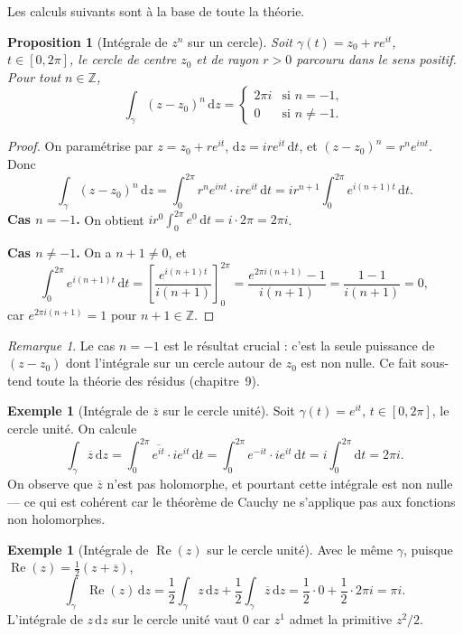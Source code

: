 \documentclass[12pt,a4paper,openany]{book}
\theoremstyle{definition}
\newtheorem{exemple}[definition]{Exemple}
\theoremstyle{plain}
\newtheorem{proposition}[definition]{Proposition}
\theoremstyle{remark}
\newtheorem{remarque}[definition]{Remarque}
\newcommand{\Z}{\mathbb{Z}}
\DeclareMathOperator{\re}{Re}
\newcommand{\dd}{\mathrm{d}}
\newcommand{\conj}[1]{\overline{#1}}
\begin{document}
Les calculs suivants sont à la base de toute la théorie.

\begin{proposition}[Intégrale de $z^n$ sur un cercle]\label{prop:integrale-zn-cercle}
Soit $\gamma(t) = z_0 + re^{it}$, $t \in [0, 2\pi]$, le cercle de centre
$z_0$ et de rayon $r > 0$ parcouru dans le sens positif. Pour tout
$n \in \Z$,
\[
  \int_\gamma (z - z_0)^n \, \dd z =
  \begin{cases}
    2\pi i & \text{si } n = -1, \\
    0      & \text{si } n \neq -1.
  \end{cases}
\]
\end{proposition}

\begin{proof}
On paramétrise par $z = z_0 + re^{it}$, $\dd z = ire^{it}\,\dd t$, et
$(z - z_0)^n = r^n e^{int}$. Donc
\[
  \int_\gamma (z-z_0)^n\,\dd z
  = \int_0^{2\pi} r^n e^{int} \cdot ire^{it}\,\dd t
  = ir^{n+1} \int_0^{2\pi} e^{i(n+1)t}\,\dd t.
\]
\textbf{Cas $n = -1$.} On obtient $ir^0 \int_0^{2\pi} e^{0}\,\dd t
= i \cdot 2\pi = 2\pi i$.

\textbf{Cas $n \neq -1$.} On a $n+1 \neq 0$, et
\[
  \int_0^{2\pi} e^{i(n+1)t}\,\dd t
  = \left[\frac{e^{i(n+1)t}}{i(n+1)}\right]_0^{2\pi}
  = \frac{e^{2\pi i(n+1)} - 1}{i(n+1)} = \frac{1-1}{i(n+1)} = 0,
\]
car $e^{2\pi i(n+1)} = 1$ pour $n+1 \in \Z$.
\end{proof}

\begin{remarque}\label{rem:cas-n-moins-un-crucial}
Le cas $n = -1$ est le résultat crucial : c'est la seule puissance de
$(z-z_0)$ dont l'intégrale sur un cercle autour de $z_0$ est non nulle. Ce
fait sous-tend toute la théorie des résidus (chapitre~9).
\end{remarque}

\begin{exemple}[Intégrale de $\conj{z}$ sur le cercle unité]\label{ex:integrale-zbar}
Soit $\gamma(t) = e^{it}$, $t \in [0, 2\pi]$, le cercle unité. On calcule
\[
  \int_\gamma \conj{z} \, \dd z
  = \int_0^{2\pi} \overline{e^{it}} \cdot ie^{it} \, \dd t
  = \int_0^{2\pi} e^{-it} \cdot ie^{it} \, \dd t
  = i \int_0^{2\pi} \dd t = 2\pi i.
\]
On observe que $\conj{z}$ n'est pas holomorphe, et pourtant cette intégrale
est non nulle --- ce qui est cohérent car le théorème de Cauchy ne s'applique
pas aux fonctions non holomorphes.
\end{exemple}

\begin{exemple}[Intégrale de $\re(z)$ sur le cercle unité]\label{ex:integrale-rez}
Avec le même $\gamma$, puisque $\re(z) = \tfrac{1}{2}(z + \conj{z})$,
\[
  \int_\gamma \re(z) \, \dd z
  = \frac{1}{2}\int_\gamma z\,\dd z + \frac{1}{2}\int_\gamma \conj{z}\,\dd z
  = \frac{1}{2} \cdot 0 + \frac{1}{2} \cdot 2\pi i = \pi i.
\]
L'intégrale de $z\,\dd z$ sur le cercle unité vaut $0$ car $z^1$
admet la primitive $z^2/2$.
\end{exemple}
\end{document}
